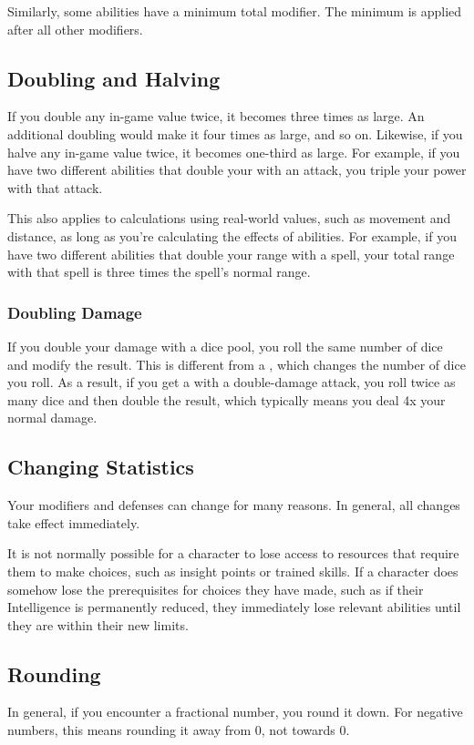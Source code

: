    Similarly, some abilities have a minimum total modifier.
    The minimum is applied after all other modifiers.

  \subsection{Doubling and Halving}\label{Doubling and Halving}
    If you double any in-game value twice, it becomes three times as large.
    An additional doubling would make it four times as large, and so on.
    Likewise, if you halve any in-game value twice, it becomes one-third as large.
    For example, if you have two different abilities that double your  with an attack, you triple your power with that attack.

    This also applies to calculations using real-world values, such as movement and distance, as long as you're calculating the effects of abilities.
    For example, if you have two different abilities that double your range with a spell, your total range with that spell is three times the spell's normal range.

    \subsubsection{Doubling Damage}
      If you double your damage with a dice pool, you roll the same number of dice and modify the result.
      This is different from a , which changes the number of dice you roll.
      As a result, if you get a  with a double-damage attack, you roll twice as many dice and then double the result, which typically means you deal 4x your normal damage.

  \subsection{Changing Statistics}

    Your modifiers and defenses can change for many reasons.
    In general, all changes take effect immediately.

    It is not normally possible for a character to lose access to resources that require them to make choices, such as insight points or trained skills.
    If a character does somehow lose the prerequisites for choices they have made, such as if their Intelligence is permanently reduced, they immediately lose relevant abilities until they are within their new limits.

  \subsection{Rounding}
    In general, if you encounter a fractional number, you round it down.
    For negative numbers, this means rounding it away from 0, not towards 0.

